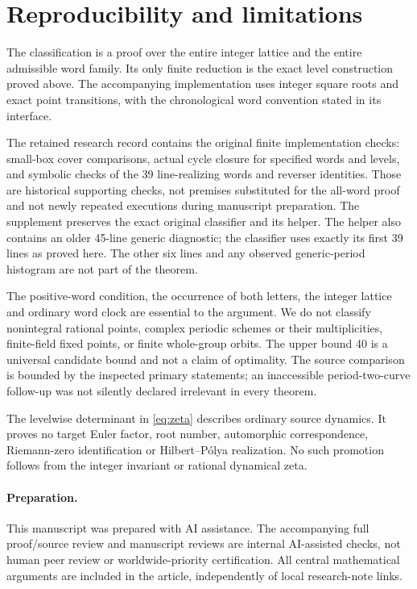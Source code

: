 \section{Reproducibility and limitations}\label{sec:scope}

The classification is a proof over the entire integer
lattice and the entire admissible word family. Its only
finite reduction is the exact level construction proved
above. The accompanying implementation uses integer square
roots and exact point transitions, with the chronological
word convention stated in its interface.

The retained research record contains the original finite
implementation checks: small-box cover comparisons, actual
cycle closure for specified words and levels, and symbolic
checks of the 39 line-realizing words and reverser identities.
Those are historical supporting checks, not premises
substituted for the all-word proof and not newly repeated
executions during manuscript preparation. The supplement
preserves the exact original classifier and its helper.
The helper also contains an older 45-line generic diagnostic;
the classifier uses exactly its first 39 lines as proved
here. The other six lines and any observed generic-period
histogram are not part of the theorem.

The positive-word condition, the occurrence of both letters,
the integer lattice and ordinary word clock are essential
to the argument. We do not classify nonintegral rational
points, complex periodic schemes or their multiplicities,
finite-field fixed points, or finite whole-group orbits.
The upper bound 40 is a universal candidate bound and not
a claim of optimality. The source comparison is bounded
by the inspected primary statements; an inaccessible
period-two-curve follow-up was not silently declared
irrelevant in every theorem.

The levelwise determinant in \eqref{eq:zeta} describes
ordinary source dynamics. It proves no target Euler
factor, root number, automorphic correspondence,
Riemann-zero identification or Hilbert--P\'olya
realization. No such promotion follows from the
integer invariant or rational dynamical zeta.

\paragraph{Preparation.}
This manuscript was prepared with AI assistance. The
accompanying full proof/source review and manuscript
reviews are internal AI-assisted checks, not human
peer review or worldwide-priority certification.
All central mathematical arguments are included in
the article, independently of local research-note links.
